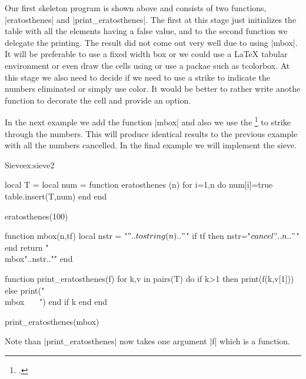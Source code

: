 Our first skeleton program is shown above and consists of two functions, |eratosthenes| and |print_eratosthenes|. The first at this stage just initializes the table with all the elements having a false value, and to the second function we delegate the printing. The result did not come out very well due to using |mbox|. It will be preferable to use a fixed width box or we could use a LaTeX tabular environment or even draw the cells using \tikzname or use a packae such as tcolorbox. At this stage we also need to decide if we need to use a strike to indicate the numbers eliminated or simply use color. It would be better to rather write anothe function to decorate the cell and provide an option.

In the next example we add the function |mbox| and also we use the \footcite{cancel} to strike through the
numbers. This will produce identical results to the previous example with all the numbers cancelled. In the final
example we will implement the sieve.

\begin{texexample}{Sieve}{ex:sieve2}
\begin{luacode}
local T = {}
local num = {}
function eratosthenes (n)
   for i=1,n do
     num[i]=true
     table.insert(T,num)
   end
end

eratosthenes(100)

function mbox(n,tf)
  local nstr = "$"..tostring(n).."$"
  if tf then nstr="$\\cancel{"..n.."}$" end
  return "\\mbox{"..nstr.."}"
end

function print_eratosthenes(f)
  for k,v in pairs(T) do
    if k>1 then print(f(k,v[1])) 
    else
      print("\\mbox{~~~} ")
    end
    if k%
  end
end  


print_eratosthenes(mbox)
\end{luacode}
\end{texexample}

Note than |print_eratosthenes| now takes one argument |f| which is a function.


